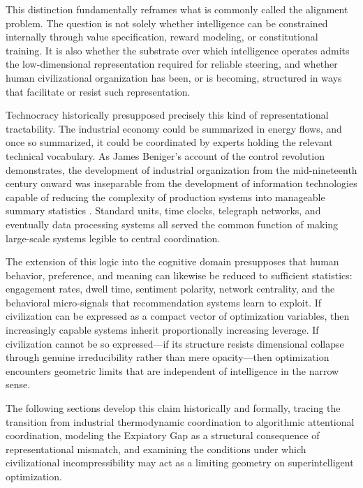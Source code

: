 \documentclass[12pt]{article}
\begin{document}
This distinction fundamentally reframes what is commonly called the alignment problem. The question is not solely whether intelligence can be constrained internally through value specification, reward modeling, or constitutional training. It is also whether the substrate over which intelligence operates admits the low-dimensional representation required for reliable steering, and whether human civilizational organization has been, or is becoming, structured in ways that facilitate or resist such representation.

Technocracy historically presupposed precisely this kind of representational tractability. The industrial economy could be summarized in energy flows, and once so summarized, it could be coordinated by experts holding the relevant technical vocabulary. As James Beniger's account of the control revolution demonstrates, the development of industrial organization from the mid-nineteenth century onward was inseparable from the development of information technologies capable of reducing the complexity of production systems into manageable summary statistics \citep{Beniger1986}. Standard units, time clocks, telegraph networks, and eventually data processing systems all served the common function of making large-scale systems legible to central coordination.

The extension of this logic into the cognitive domain presupposes that human behavior, preference, and meaning can likewise be reduced to sufficient statistics: engagement rates, dwell time, sentiment polarity, network centrality, and the behavioral micro-signals that recommendation systems learn to exploit. If civilization can be expressed as a compact vector of optimization variables, then increasingly capable systems inherit proportionally increasing leverage. If civilization cannot be so expressed---if its structure resists dimensional collapse through genuine irreducibility rather than mere opacity---then optimization encounters geometric limits that are independent of intelligence in the narrow sense.

The following sections develop this claim historically and formally, tracing the transition from industrial thermodynamic coordination to algorithmic attentional coordination, modeling the Expiatory Gap as a structural consequence of representational mismatch, and examining the conditions under which civilizational incompressibility may act as a limiting geometry on superintelligent optimization.

\end{document}
